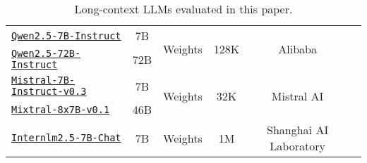 \begin{table*}
{\begin{tabular}{lccccc}
    \href{https://huggingface.co/Qwen/Qwen2.5-7B-Instruct}{\texttt{Qwen2.5-7B-Instruct}} & 7B & \multirow{2}{*}{Weights} & \multirow{2}{*}{128K}  & \multirow{2}{*}{Alibaba} \\
    \href{https://huggingface.co/Qwen/Qwen2.5-72B-Instruct}{\texttt{Qwen2.5-72B-Instruct}} & 72B & & & \\ \midrule

    \href{https://huggingface.co/mistralai/Mistral-7B-Instruct-v0.3}{\texttt{Mistral-7B-Instruct-v0.3}} & 7B & \multirow{2}{*}{Weights} & \multirow{2}{*}{32K} & \multirow{2}{*}{Mistral AI} \\
    \href{https://huggingface.co/mistralai/Mixtral-8x7B-v0.1}{\texttt{Mixtral-8x7B-v0.1}} & 46B & & &  \\ \midrule

    \href{https://huggingface.co/internlm/internlm2_5-7b-chat}{\texttt{Internlm2.5-7B-Chat}} & 7B & Weights & 1M & Shanghai AI Laboratory \\
    \bottomrule
    \end{tabular}
    }
    
    \caption{Long-context LLMs evaluated in this paper.}
    \label{tab:app_models}
\end{table*}